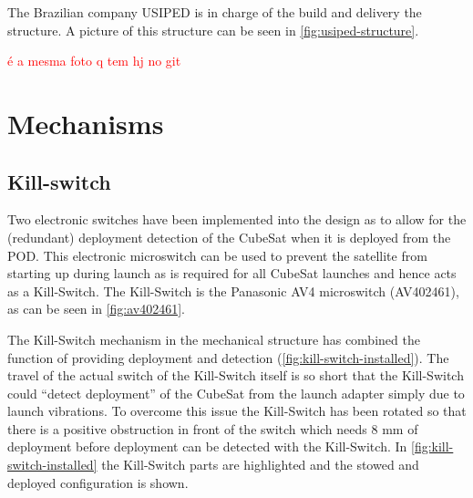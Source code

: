
The Brazilian company USIPED is in charge of the build and delivery the structure. A picture of this structure can be seen in \autoref{fig:usiped-structure}.

\textcolor{red}{é a mesma foto q tem hj no git}

\section{Mechanisms}


\subsection{Kill-switch}

Two electronic switches have been implemented into the design as to allow for the (redundant) deployment detection of the CubeSat when it is deployed from the POD. This electronic microswitch can be used to prevent the satellite from starting up during launch as is required for all CubeSat launches and hence acts as a Kill-Switch. The Kill-Switch is the Panasonic AV4 microswitch (AV402461), as can be seen in \autoref{fig:av402461}.


The Kill-Switch mechanism in the mechanical structure has combined the function of providing deployment and detection (\autoref{fig:kill-switch-installed}). The travel of the actual switch of the Kill-Switch itself is so short that the Kill-Switch could ``detect deployment'' of the CubeSat from the launch adapter simply due to launch vibrations. To overcome this issue the Kill-Switch has been rotated so that there is a positive obstruction in front of the switch which needs 8 mm of deployment before deployment can be detected with the Kill-Switch. In \autoref{fig:kill-switch-installed} the Kill-Switch parts are highlighted and the stowed and deployed configuration is shown.

